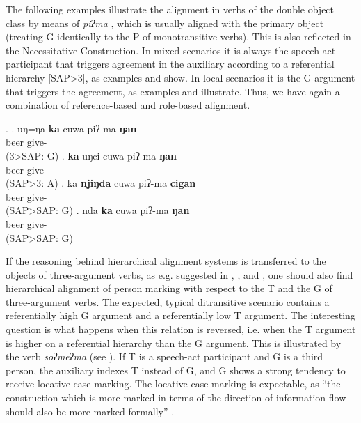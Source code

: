 The following examples illustrate the alignment in verbs of the double object class by means of  \emph{piʔma} , which is usually aligned with the primary object (treating G identically to the P of monotransitive verbs). This is also reflected in the Necessitative Construction. In mixed scenarios  it is always the speech-act participant that triggers agreement in the auxiliary according to a referential hierarchy [SAP>3], as examples \Next[a] and \Next[b] show. In local scenarios it is the G argument that triggers the agreement, as examples \Next[c] and \Next[d] illustrate. Thus, we have again a combination of reference-based and role-based alignment. 
 
\ex. \ag.  uŋ=ŋa {\bf ka} cuwa piʔ-ma {\bf ŋan}\\
    beer\sc{}  give- \\
 (3>SAP: G) 
\bg. {\bf ka} uŋci cuwa  piʔ-ma {\bf ŋan}\\
  beer\sc{}  give- \\
 (SAP>3: A)
\bg. ka {\bf njiŋda} cuwa piʔ-ma {\bf cigan}\\
  beer\sc{} give- \\ 
	(SAP>SAP: G)
\bg. nda {\bf ka} cuwa piʔ-ma {\bf ŋan}\\
  beer\sc{} give- \\ 
	(SAP>SAP: G)


If the reasoning behind hierarchical alignment systems is transferred to the objects of three-argument verbs, as e.g. suggested in \citet{Haspelmath2004Explaining}, \citet{Malchukovetal2010Ditrans-overview}, and \citet{ Siewierska2003Person}, one should also find hierarchical alignment of person marking with respect to the T and the G of three-argument verbs. The expected, typical ditransitive scenario contains a referentially high G argument and a referentially low T argument. The interesting question is what happens when this relation is reversed, i.e. when the T argument is higher on a referential hierarchy than the G argument. This is illustrated by the verb \emph{soʔmeʔma}   (see \Next). If T is a speech-act participant  and G is a third person, the auxiliary indexes T instead of G, and G shows a strong tendency to receive locative case marking. The locative case marking is expectable, as “the construction which is more marked in terms of the direction of information flow should also be more marked formally” \citep[128]{Comrie1989Language}. 

